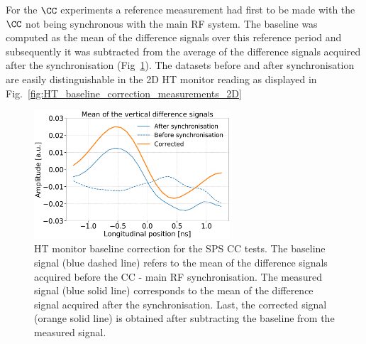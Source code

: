 For the $\CC$ experiments a reference measurement had first to be made with the $\CC$ not being synchronous with the main RF system. The baseline was computed as the mean of the difference signals over this reference period and subsequently it was subtracted from the average of the difference signals acquired after the synchronisation (Fig~\ref{fig:HT_baseline_correction}). The datasets before and after synchronisation are easily distinguishable in the 2D HT monitor reading as displayed in Fig.~\ref{fig:HT_baseline_correction_measurements_2D}

\begin{figure}[!h]
   \centering         
   \includegraphics[width=0.65\textwidth]{images/Ch4/HT_measures_vs_reference_vs_corrected__20180530_135105_baseline_correction_new_version_CC_post_processing.png}
       \caption{HT monitor baseline correction for the SPS CC tests. The baseline signal (blue dashed line) refers to the mean of the difference signals acquired before the CC - main RF synchronisation. The measured signal (blue solid line) corresponds to the mean of the difference signal acquired after the synchronisation. Last, the corrected signal (orange solid line) is obtained after subtracting the baseline from the measured signal.}
       \label{fig:HT_baseline_correction}
\end{figure}

